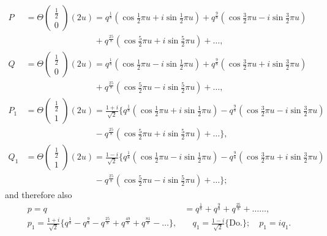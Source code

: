 \documentclass[11pt,a4paper]{book}
\begin{document}
\begin{align*}
P &= \Theta\begin{pmatrix} \tfrac{1}{2} \\ 0 \end{pmatrix}(2u) = q^{\frac{1}{8}}(\cos\tfrac{1}{2}\pi u + i\sin\tfrac{1}{2}\pi u) + q^{\frac{9}{8}}(\cos\tfrac{3}{2}\pi u - i\sin\tfrac{3}{2}\pi u) \\
  &\qquad\qquad\qquad\qquad + q^{\frac{25}{8}}(\cos\tfrac{5}{2}\pi u + i\sin\tfrac{5}{2}\pi u) + \dots, \\
Q &= \Theta\begin{pmatrix} \tfrac{1}{2} \\ 0 \end{pmatrix}(2u) = q^{\frac{1}{8}}(\cos\tfrac{1}{2}\pi u - i\sin\tfrac{1}{2}\pi u) + q^{\frac{9}{8}}(\cos\tfrac{3}{2}\pi u + i\sin\tfrac{3}{2}\pi u) \\
  &\qquad\qquad\qquad\qquad + q^{\frac{25}{8}}(\cos\tfrac{5}{2}\pi u - i\sin\tfrac{5}{2}\pi u) + \dots, \\[0.5em]
P_1 &= \Theta\begin{pmatrix} \tfrac{1}{2} \\ 1 \end{pmatrix}(2u) = \frac{1 + i}{\sqrt{2}}\{q^{\frac{1}{8}}(\cos\tfrac{1}{2}\pi u + i\sin\tfrac{1}{2}\pi u) - q^{\frac{9}{8}}(\cos\tfrac{3}{2}\pi u - i\sin\tfrac{3}{2}\pi u) \\
  &\qquad\qquad\qquad\qquad - q^{\frac{25}{8}}(\cos\tfrac{5}{2}\pi u + i\sin\tfrac{5}{2}\pi u) + \dots\}, \\[0.5em]
Q_1 &= \Theta\begin{pmatrix} \tfrac{1}{2} \\ 1 \end{pmatrix}(2u) = \frac{1 - i}{\sqrt{2}}\{q^{\frac{1}{8}}(\cos\tfrac{1}{2}\pi u - i\sin\tfrac{1}{2}\pi u) - q^{\frac{9}{8}}(\cos\tfrac{3}{2}\pi u + i\sin\tfrac{3}{2}\pi u) \\
  &\qquad\qquad\qquad\qquad - q^{\frac{25}{8}}(\cos\tfrac{5}{2}\pi u - i\sin\tfrac{5}{2}\pi u) + \dots\};
\end{align*}
and therefore also
\begin{align*}
p = q &= q^{\frac{1}{8}} + q^{\frac{9}{8}} + q^{\frac{25}{8}} + \dots\dots, \\
p_1 = \frac{1 + i}{\sqrt{2}}\{q^{\frac{1}{8}} - q^{\frac{9}{8}} - q^{\frac{25}{8}} + q^{\frac{49}{8}} + q^{\frac{81}{8}} - \dots\}, &\quad
q_1 = \frac{1 - i}{\sqrt{2}}\{\text{Do.}\};\quad p_1 = iq_1.
\end{align*}
\end{document}
